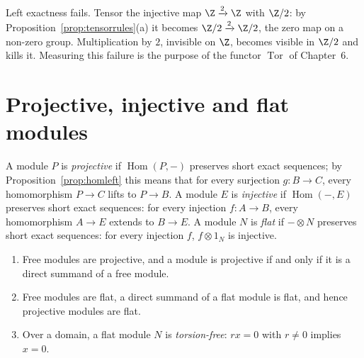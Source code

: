 Left exactness fails. Tensor the injective map $\Z\xrightarrow2\Z$ with $\Z/2$: by Proposition~\ref{prop:tensorrules}(a) it becomes $\Z/2\xrightarrow2\Z/2$, the zero map on a non-zero group. Multiplication by $2$, invisible on
$\Z$, becomes visible in $\Z/2$ and kills it. Measuring this failure is the purpose of the functor $\operatorname{Tor}$ of Chapter~6.

\section{Projective, injective and flat modules}

\begin{definition}\label{def:projective}
A module $P$ is \emph{projective} if $\operatorname{Hom}(P,-)$ preserves short exact sequences; by Proposition~\ref{prop:homleft} this means that for every surjection $g\colon B\to C$, every homomorphism $P\to C$ lifts to $P\to B$.
A module $E$ is \emph{injective} if $\operatorname{Hom}(-,E)$ preserves short exact sequences: for every injection $f\colon A\to B$, every homomorphism $A\to E$ extends to $B\to E$. A module $N$ is \emph{flat} if $-\otimes N$ preserves short
exact sequences: for every injection $f$, $f\otimes1_N$ is injective.
\end{definition}

\begin{proposition}\label{prop:projective}
\leavevmode
\begin{enumerate}[label=(\alph*)]
\item Free modules are projective, and a module is projective if and only if it is a direct summand of a free module.
\item Free modules are flat, a direct summand of a flat module is flat, and hence projective modules are flat.
\item Over a domain, a flat module $N$ is \emph{torsion-free}: $rx=0$ with $r\ne0$ implies $x=0$.
\end{enumerate}
\end{proposition}

